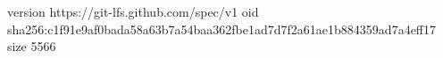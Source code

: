 version https://git-lfs.github.com/spec/v1
oid sha256:c1f91e9af0bada58a63b7a54baa362fbe1ad7d7f2a61ae1b884359ad7a4eff17
size 5566
